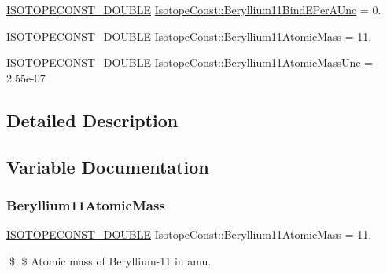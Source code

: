 \begin{DoxyCompactItemize}
\mbox{\hyperlink{group___isotope_const-_macros_ga8f45a7272ce02c0b4c65c44636ed719a}{I\+S\+O\+T\+O\+P\+E\+C\+O\+N\+S\+T\+\_\+\+D\+O\+U\+B\+LE}} \mbox{\hyperlink{group___isotope_const-_beryllium-_be11_ga3a5ff2945bc5a9a6d51c72b3d2378b05}{Isotope\+Const\+::\+Beryllium11\+Bind\+E\+Per\+A\+Unc}} = 0.
\item 
\mbox{\hyperlink{group___isotope_const-_macros_ga8f45a7272ce02c0b4c65c44636ed719a}{I\+S\+O\+T\+O\+P\+E\+C\+O\+N\+S\+T\+\_\+\+D\+O\+U\+B\+LE}} \mbox{\hyperlink{group___isotope_const-_beryllium-_be11_ga73e36948e453bc8b6765c34762fe3257}{Isotope\+Const\+::\+Beryllium11\+Atomic\+Mass}} = 11.
\item 
\mbox{\hyperlink{group___isotope_const-_macros_ga8f45a7272ce02c0b4c65c44636ed719a}{I\+S\+O\+T\+O\+P\+E\+C\+O\+N\+S\+T\+\_\+\+D\+O\+U\+B\+LE}} \mbox{\hyperlink{group___isotope_const-_beryllium-_be11_gac311e1fde90eefab1fafc069f548c201}{Isotope\+Const\+::\+Beryllium11\+Atomic\+Mass\+Unc}} = 2.\+55e-\/07
\end{DoxyCompactItemize}


\subsection{Detailed Description}


\subsection{Variable Documentation}
\mbox{\label{group___isotope_const-_beryllium-_be11_ga73e36948e453bc8b6765c34762fe3257}} 
\subsubsection{\texorpdfstring{Beryllium11\+Atomic\+Mass}{Beryllium11AtomicMass}}
{\footnotesize\ttfamily \mbox{\hyperlink{group___isotope_const-_macros_ga8f45a7272ce02c0b4c65c44636ed719a}{I\+S\+O\+T\+O\+P\+E\+C\+O\+N\+S\+T\+\_\+\+D\+O\+U\+B\+LE}} Isotope\+Const\+::\+Beryllium11\+Atomic\+Mass = 11.}

\$ \$ Atomic mass of Beryllium-\/11 in amu. \mbox{\label{group___isotope_const-_beryllium-_be11_gac311e1fde90eefab1fafc069f548c201}} 
